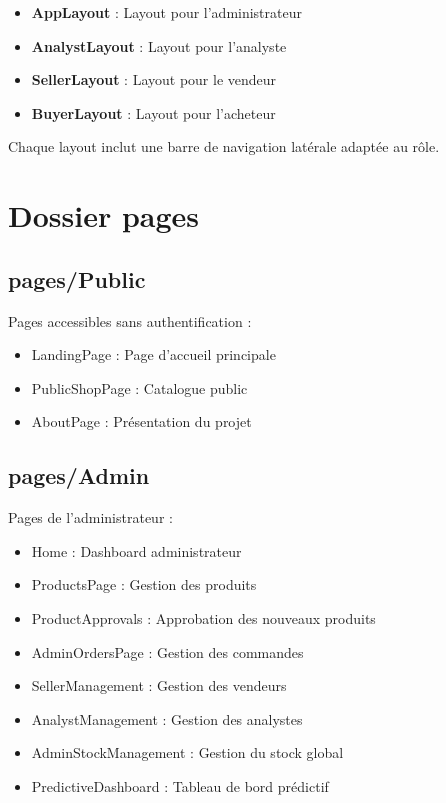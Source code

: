 \documentclass[12pt,a4paper]{report}
\begin{document}
\begin{itemize}[noitemsep]
    \item \textbf{AppLayout} : Layout pour l'administrateur
    \item \textbf{AnalystLayout} : Layout pour l'analyste
    \item \textbf{SellerLayout} : Layout pour le vendeur
    \item \textbf{BuyerLayout} : Layout pour l'acheteur
\end{itemize}

Chaque layout inclut une barre de navigation latérale adaptée au rôle.

\section{Dossier pages}

\subsection{pages/Public}

Pages accessibles sans authentification :
\begin{itemize}[noitemsep]
    \item LandingPage : Page d'accueil principale
    \item PublicShopPage : Catalogue public
    \item AboutPage : Présentation du projet
\end{itemize}

\subsection{pages/Admin}

Pages de l'administrateur :
\begin{itemize}[noitemsep]
    \item Home : Dashboard administrateur
    \item ProductsPage : Gestion des produits
    \item ProductApprovals : Approbation des nouveaux produits
    \item AdminOrdersPage : Gestion des commandes
    \item SellerManagement : Gestion des vendeurs
    \item AnalystManagement : Gestion des analystes
    \item AdminStockManagement : Gestion du stock global
    \item PredictiveDashboard : Tableau de bord prédictif
\end{itemize}
\end{document}
